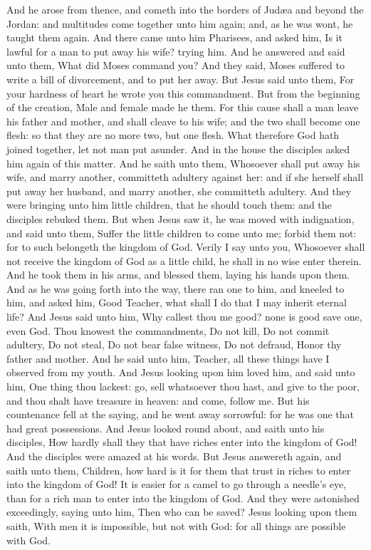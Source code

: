 And he arose from thence, and cometh into the borders of Judæa and beyond the Jordan: and multitudes come together unto him again; and, as he was wont, he taught them again.  And there came unto him Pharisees, and asked him, Is it lawful for a man to put away his wife? trying him. And he answered and said unto them, What did Moses command you? And they said, Moses suffered to write a bill of divorcement, and to put her away. But Jesus said unto them, For your hardness of heart he wrote you this commandment. But from the beginning of the creation, Male and female made he them. For this cause shall a man leave his father and mother, and shall cleave to his wife; and the two shall become one flesh: so that they are no more two, but one flesh. What therefore God hath joined together, let not man put asunder. And in the house the disciples asked him again of this matter. And he saith unto them, Whosoever shall put away his wife, and marry another, committeth adultery against her: and if she herself shall put away her husband, and marry another, she committeth adultery.  And they were bringing unto him little children, that he should touch them: and the disciples rebuked them. But when Jesus saw it, he was moved with indignation, and said unto them, Suffer the little children to come unto me; forbid them not: for to such belongeth the kingdom of God. Verily I say unto you, Whosoever shall not receive the kingdom of God as a little child, he shall in no wise enter therein. And he took them in his arms, and blessed them, laying his hands upon them.  And as he was going forth into the way, there ran one to him, and kneeled to him, and asked him, Good Teacher, what shall I do that I may inherit eternal life? And Jesus said unto him, Why callest thou me good? none is good save one, even God. Thou knowest the commandments, Do not kill, Do not commit adultery, Do not steal, Do not bear false witness, Do not defraud, Honor thy father and mother. And he said unto him, Teacher, all these things have I observed from my youth. And Jesus looking upon him loved him, and said unto him, One thing thou lackest: go, sell whatsoever thou hast, and give to the poor, and thou shalt have treasure in heaven: and come, follow me. But his countenance fell at the saying, and he went away sorrowful: for he was one that had great possessions.  And Jesus looked round about, and saith unto his disciples, How hardly shall they that have riches enter into the kingdom of God! And the disciples were amazed at his words. But Jesus answereth again, and saith unto them, Children, how hard is it for them that trust in riches to enter into the kingdom of God! It is easier for a camel to go through a needle’s eye, than for a rich man to enter into the kingdom of God. And they were astonished exceedingly, saying unto him, Then who can be saved? Jesus looking upon them saith, With men it is impossible, but not with God: for all things are possible with God. 